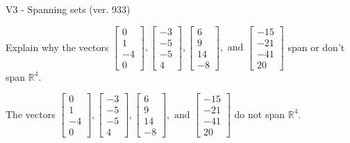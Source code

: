 \begin{exercise}
  \begin{exerciseTitle}V3 - Spanning sets (ver. 933)\end{exerciseTitle}
  \begin{exerciseStatement}
    Explain why the vectors \(\left[\begin{array}{r}
0 \\
1 \\
-4 \\
0
\end{array}\right] , \left[\begin{array}{r}
-3 \\
-5 \\
-5 \\
4
\end{array}\right] , \left[\begin{array}{r}
6 \\
9 \\
14 \\
-8
\end{array}\right] , \text{ and } \left[\begin{array}{r}
-15 \\
-21 \\
-41 \\
20
\end{array}\right]\) span or don't span \(\mathbb{R}^4\). 
	


  \end{exerciseStatement}
  \begin{exerciseAnswer}
   The vectors \(\left[\begin{array}{r}
0 \\
1 \\
-4 \\
0
\end{array}\right] , \left[\begin{array}{r}
-3 \\
-5 \\
-5 \\
4
\end{array}\right] , \left[\begin{array}{r}
6 \\
9 \\
14 \\
-8
\end{array}\right] , \text{ and } \left[\begin{array}{r}
-15 \\
-21 \\
-41 \\
20
\end{array}\right]\) 
  	 do not  
	span \(\mathbb{R}^4\).
  


  \end{exerciseAnswer}
\end{exercise}